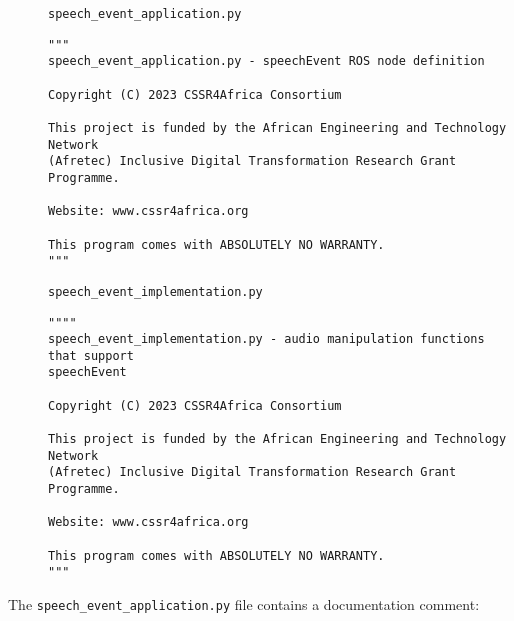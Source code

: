 \documentclass{CSSRforAfrica}
\newcommand{\blank}{~\\}
\newcommand{\checkboxChecked}{\fbox{\ding{51}}} %
\begin{document}
\begin{description}

\item[\checkboxChecked] {\small \verb+speech_event_application.py+}  
{\small \begin{verbatim}
"""
speech_event_application.py - speechEvent ROS node definition

Copyright (C) 2023 CSSR4Africa Consortium

This project is funded by the African Engineering and Technology Network 
(Afretec) Inclusive Digital Transformation Research Grant Programme.

Website: www.cssr4africa.org

This program comes with ABSOLUTELY NO WARRANTY.
"""

\end{verbatim} }

\item[\checkboxChecked]  {\small \verb+speech_event_implementation.py+} 
{\small \begin{verbatim}
""""
speech_event_implementation.py - audio manipulation functions that support 
speechEvent

Copyright (C) 2023 CSSR4Africa Consortium

This project is funded by the African Engineering and Technology Network 
(Afretec) Inclusive Digital Transformation Research Grant Programme.

Website: www.cssr4africa.org

This program comes with ABSOLUTELY NO WARRANTY.
"""
\end{verbatim} }


\end{description} 


\noindent The {\small \verb+speech_event_application.py+} file contains a documentation comment:
\end{document}
